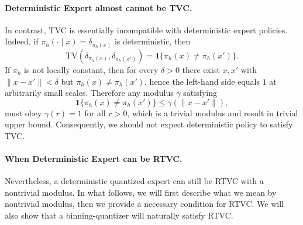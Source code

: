 \documentclass{article}
\let\oldparagraph\paragraph
\renewcommand{\paragraph}[1]{\oldparagraph{#1.}}
\begin{document}
\paragraph{Deterministic Expert almost cannot be TVC}
In contrast, TVC is essentially incompatible with deterministic expert policies.
Indeed, if $\pi_h(\cdot\mid x)=\delta_{\pi_h(x)}$ is deterministic, then
\begin{equation*}
\mathrm{TV}\left(\delta_{\pi_h(x)},\delta_{\pi_h(x')}\right)
=\mathbf 1\{\pi_h(x)\neq \pi_h(x')\}.
\end{equation*}
If $\pi_h$ is not locally constant, then for every $\delta>0$ there exist
$x,x'$ with $\|x-x'\|<\delta$ but $\pi_h(x)\neq \pi_h(x')$, hence the left-hand
side equals $1$ at arbitrarily small scales. Therefore any modulus $\gamma$
satisfying
\begin{equation*}
    \mathbf 1\{\pi_h(x)\neq \pi_h(x')\}\le \gamma(\|x-x'\|),
\end{equation*}
must obey $\gamma(r)=1$ for all $r>0$, which is a trivial modulus and result in trivial upper bound. Consequently, we should not expect deterministic policy to satisfy TVC.

\paragraph{When Deterministic Expert can be RTVC}
Nevertheless, a deterministic quantized expert can still be RTVC with a nontrivial modulus. In what follows, we will first describe what we mean by nontrivial modulus, then we provide a necessary condition for RTVC. We will also show that a binning-quantizer will naturally satisfy RTVC. 
\end{document}
